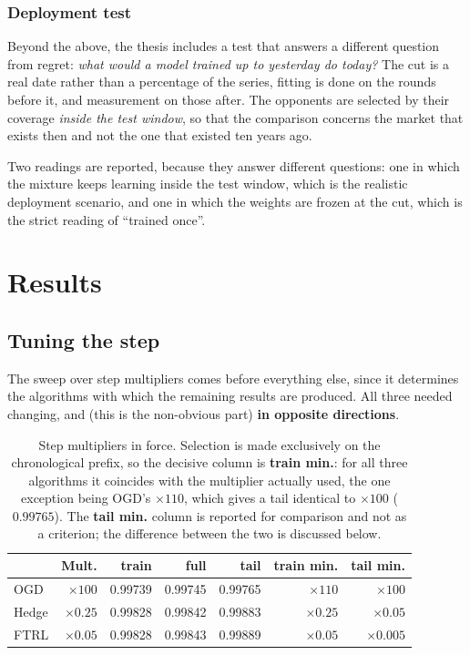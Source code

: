 \documentclass[12pt,a4paper,oneside]{report}
\renewcommand{\_}{\oldunderscore\allowbreak}
\theoremstyle{definition}
\theoremstyle{plain}
\theoremstyle{remark}
\begin{document}
\subsection{Deployment test}

Beyond the above, the thesis includes a test that answers a different question from regret:
\emph{what would a model trained up to yesterday do today?} The cut is a real date rather than a
percentage of the series, fitting is done on the rounds before it, and measurement on those
after. The opponents are selected by their coverage \emph{inside the test window}, so that the
comparison concerns the market that exists then and not the one that existed ten years ago.

Two readings are reported, because they answer different questions: one in which the mixture
keeps learning inside the test window, which is the realistic deployment scenario, and one in
which the weights are frozen at the cut, which is the strict reading of ``trained once''.

\chapter{Results}
\label{ch:results}

\section{Tuning the step}
\label{sec:res-steps}

The sweep over step multipliers comes before everything else, since it determines the algorithms
with which the remaining results are produced. All three needed changing, and (this is the
non-obvious part) \textbf{in opposite directions}.

\begin{table}[H]
\centering
\begin{tabular}{@{}lrrrrrr@{}}
\toprule
& \textbf{Mult.} & \textbf{train} & \textbf{full} & \textbf{tail} &
\textbf{train min.} & \textbf{tail min.} \\
\midrule
OGD   & $\times 100$   & 0.99739 & 0.99745 & 0.99765 & $\times 110$   & $\times 100$ \\
Hedge & $\times 0.25$  & 0.99828 & 0.99842 & 0.99883 & $\times 0.25$  & $\times 0.05$ \\
FTRL  & $\times 0.05$  & 0.99828 & 0.99843 & 0.99889 & $\times 0.05$  & $\times 0.005$ \\
\bottomrule
\end{tabular}
\caption{Step multipliers in force. Selection is made exclusively on the chronological prefix, so
the decisive column is \textbf{train min.}: for all three algorithms it coincides with the
multiplier actually used, the one exception being OGD's $\times 110$, which gives a tail identical
to $\times 100$ ($0.99765$). The \textbf{tail min.} column is reported for comparison and not as a
criterion; the difference between the two is discussed below.}
\end{table}
\end{document}
